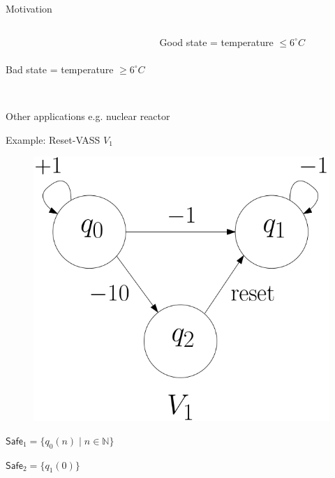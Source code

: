 \documentclass{beamer}
\newcommand{\N}{\mathbb{N}}
\newcommand{\Safe}{\textsf{Safe}}
\begin{document}
\begin{frame}{Motivation}
\begin{columns}[T]
\phantom{Fridge.png} \\
\phantom{Fridge.png} \\
{\sf Bad} state = temperature $\geq 6^\circ C$ \newline

 {\sf Good} state = temperature $\leq 6^\circ C$ \\

\end{columns}

\pause

\phantom{Fridge.png} \\
Other applications e.g.  nuclear reactor 

  \end{frame}
  \begin{frame}{Example: Reset-VASS $V_1$}
  
  
   \begin{center}
 	\begin{figure}
 	\vspace{.06cm}
\includegraphics[width=.47\textwidth]{FigA}
	\end{figure}
\end{center}  

$\Safe_1 = \{q_0(n) \mid n \in \N\}$


$\Safe_2 = \{q_1(0)\} $



  \end{frame}
\end{document}
